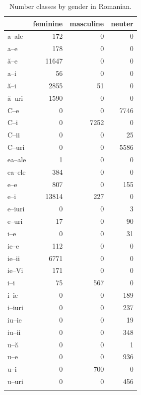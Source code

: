 \begin{table}[!htpb]
  \centering
  \begin{tabular}{lrrr}
    \lsptoprule
           & feminine & masculine & neuter \\
    \midrule
    a--ale  & 172      & 0         & 0      \\
    a--e    & 178      & 0         & 0      \\
    ă--e    & 11647    & 0         & 0      \\
    a--i    & 56       & 0         & 0      \\
    ă--i    & 2855     & 51        & 0      \\
    ă--uri  & 1590     & 0         & 0      \\
    C--e    & 0        & 0         & 7746   \\
    C--i    & 0        & 7252      & 0      \\
    C--ii   & 0        & 0         & 25     \\
    C--uri  & 0        & 0         & 5586   \\
    ea--ale & 1        & 0         & 0      \\
    ea--ele & 384      & 0         & 0      \\
    e--e    & 807      & 0         & 155    \\
    e--i    & 13814    & 227       & 0      \\
    e--iuri & 0        & 0         & 3      \\
    e--uri  & 17       & 0         & 90     \\
    i--e    & 0        & 0         & 31     \\
    ie--e   & 112      & 0         & 0      \\
    ie--ii  & 6771     & 0         & 0      \\
    ie--Vi  & 171      & 0         & 0      \\
    i--i    & 75       & 567       & 0      \\
    i--ie   & 0        & 0         & 189    \\
    i--iuri & 0        & 0         & 237    \\
    iu--ie  & 0        & 0         & 19     \\
    iu--ii  & 0        & 0         & 348    \\
    u--ă    & 0        & 0         & 1      \\
    u--e    & 0        & 0         & 936    \\
    u--i    & 0        & 700       & 0      \\
    u--uri  & 0        & 0         & 456    \\
    \lspbottomrule
  \end{tabular}
\caption{Number classes by gender in Romanian.}\label{tab:decl-rom-gender}
\end{table}

